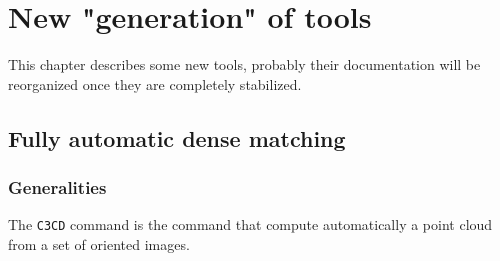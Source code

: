 \chapter{New "generation" of tools}

This chapter describes some new tools, probably their documentation will be reorganized once they are completely stabilized.



\section{Fully automatic dense matching}

\subsection{Generalities}

The {\tt C3CD} command is the command that compute automatically a point cloud from a set of oriented images.

